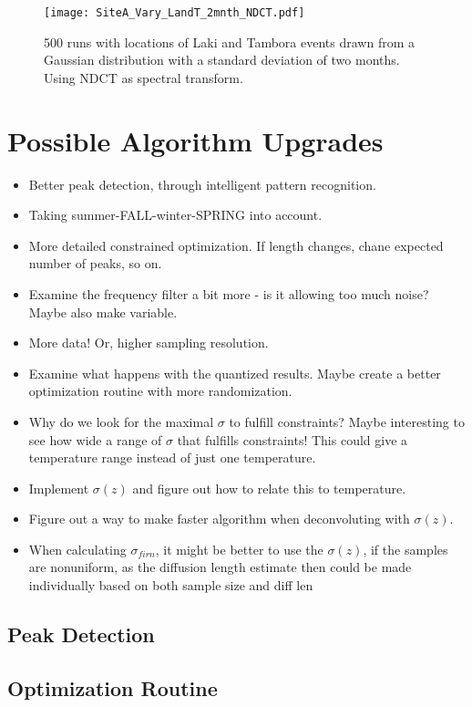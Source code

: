 \documentclass[../../CompleteThesis2/Complete_2ndDraft]{subfiles}
\begin{document}
\begin{figure}[!htb]
	\centering
	\texttt{[image: SiteA\_Vary\_LandT\_2mnth\_NDCT.pdf]}
	\caption[2 Month Variation of Event Locations, Site A]{\small 500 runs with locations of Laki and Tambora events drawn from a Gaussian distribution with a standard deviation of two months. Using NDCT as spectral transform.}
	\label{fig:SiteA_LandT_Gauss_2mnth_NDCT}
\end{figure}



\section[Upgrades][Upgrades]{Possible Algorithm Upgrades}
\label{Sec:Method_Upgrades}

\begin{itemize}
	\item Better peak detection, through intelligent pattern recognition.
	\item Taking summer-FALL-winter-SPRING into account.
	\item More detailed constrained optimization. If length changes, chane expected number of peaks, so on.
	\item Examine the frequency filter a bit more - is it allowing too much noise? Maybe also make variable.
	\item More data! Or, higher sampling resolution.
	\item Examine what happens with the quantized results. Maybe create a better optimization routine with more randomization.
	\item Why do we look for the maximal $\sigma$ to fulfill constraints? Maybe interesting to see how wide a range of $\sigma$ that fulfills constraints! This could give a temperature range instead of just one temperature.
	\item Implement $\sigma(z)$ and figure out how to relate this to temperature. 
	\item Figure out a way to make faster algorithm when deconvoluting with $\sigma(z)$.
	\item When calculating $\sigma_{firn}$, it might be better to use the $\sigma(z)$, if the samples are nonuniform, as the diffusion length estimate then could be made individually based on both sample size and diff len
\end{itemize}

\subsection[Peak Detection]{Peak Detection}
\label{Subsec:Method_Upgrades_PeakDet}

\subsection[Optimization Routine]{Optimization Routine}
\label{Subsec:Method_Upgrades_OptiRout}
\end{document}
